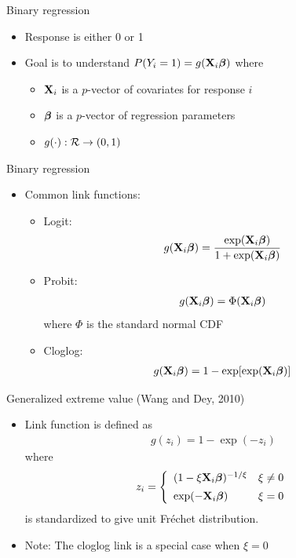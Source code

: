 \documentclass{beamer}
\begin{document}
\begin{frame}{Binary regression}
\begin{itemize} \setlength{\itemsep}{1em}
  \item Response is either 0 or 1
  \item Goal is to understand $P(Y_i = 1) = g(\mbox{\bf X}_i \mbox{\boldmath $\beta$})$ where
  \begin{itemize} \setlength{\itemsep}{0.5em}
    \item $\mbox{\bf X}_i$ is a $p$-vector of covariates for response $i$
    \item $\mbox{\boldmath $\beta$}$ is a $p$-vector of regression parameters
    \item $g(\cdot) : {\cal R} \rightarrow (0, 1)$
  \end{itemize}
\end{itemize}
\end{frame}

\begin{frame}{Binary regression}
\begin{itemize} \setlength{\itemsep}{1em}
  \item Common link functions:
  \begin{itemize} \setlength{\itemsep}{0.5em}
    \item Logit:
    \begin{align*}
      g(\mbox{\bf X}_i \mbox{\boldmath $\beta$}) = \frac{ \exp(\mbox{\bf X}_i \mbox{\boldmath $\beta$}) }{ 1 + \exp(\mbox{\bf X}_i \mbox{\boldmath $\beta$}) }
    \end{align*}
    \item Probit:
    \begin{align*}
      g(\mbox{\bf X}_i \mbox{\boldmath $\beta$}) = \Phi(\mbox{\bf X}_i \mbox{\boldmath $\beta$})
    \end{align*}
    where $\Phi$ is the standard normal CDF
    \item Cloglog:
    \begin{align*}
      g(\mbox{\bf X}_i \mbox{\boldmath $\beta$}) = 1 - \exp[\exp(\mbox{\bf X}_i \mbox{\boldmath $\beta$})]
    \end{align*}
  \end{itemize}
\end{itemize}
\end{frame}

\begin{frame}{Generalized extreme value (Wang and Dey, 2010)}
\begin{itemize} \setlength{\itemsep}{1em}
  \item Link function is defined as
  \begin{align*}
    g(z_i) = 1 - \exp(-z_i)
  \end{align*}
  where
  \begin{align*}
    z_i = \left\{ \begin{array}{ll}
      (1 - \xi \mbox{\bf X}_i \mbox{\boldmath $\beta$})^{-1 / \xi} & \xi \neq 0 \\[0.5em]
      \exp(-\mbox{\bf X}_i \mbox{\boldmath $\beta$}) & \xi = 0
      \end{array} \right.
  \end{align*}
  is standardized to give unit Fr\'{e}chet distribution.
  \item Note: The cloglog link is a special case when $\xi = 0$
\end{itemize}
\end{frame}
\end{document}
